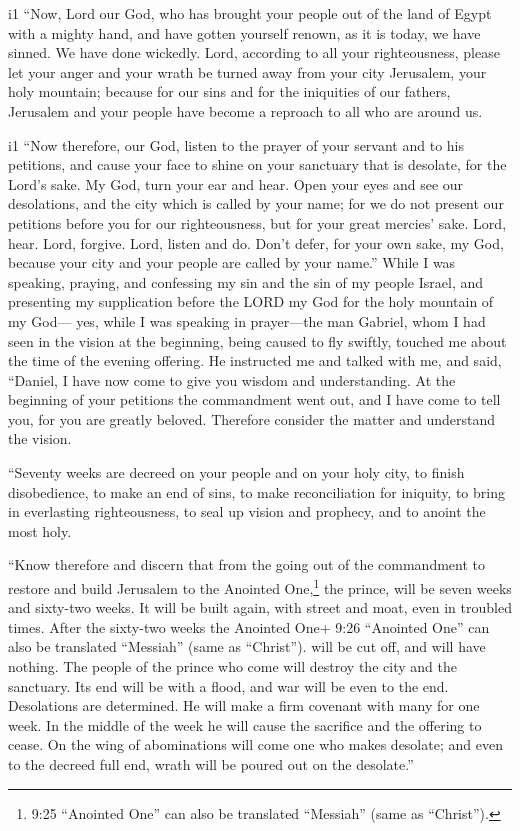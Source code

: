 i1 ``Now, Lord our God, who has brought your people out of
the land of Egypt with a mighty hand, and have gotten yourself renown,
as it is today, we have sinned. We have done wickedly. 
Lord, according to all your righteousness, please let your anger and
your wrath be turned away from your city Jerusalem, your holy mountain;
because for our sins and for the iniquities of our fathers, Jerusalem
and your people have become a reproach to all who are around us.

i1 ``Now therefore, our God, listen to the prayer of your
servant and to his petitions, and cause your face to shine on your
sanctuary that is desolate, for the Lord's sake.  My God,
turn your ear and hear. Open your eyes and see our desolations, and the
city which is called by your name; for we do not present our petitions
before you for our righteousness, but for your great mercies' sake.
 Lord, hear. Lord, forgive. Lord, listen and do. Don't
defer, for your own sake, my God, because your city and your people are
called by your name.''  While I was speaking, praying, and
confessing my sin and the sin of my people Israel, and presenting my
supplication before the LORD my God for the holy mountain of my God---
 yes, while I was speaking in prayer---the man Gabriel,
whom I had seen in the vision at the beginning, being caused to fly
swiftly, touched me about the time of the evening offering.
 He instructed me and talked with me, and said, ``Daniel, I
have now come to give you wisdom and understanding.  At the
beginning of your petitions the commandment went out, and I have come to
tell you, for you are greatly beloved. Therefore consider the matter and
understand the vision.

 ``Seventy weeks are decreed on your people and on your
holy city, to finish disobedience, to make an end of sins, to make
reconciliation for iniquity, to bring in everlasting righteousness, to
seal up vision and prophecy, and to anoint the most holy.

 ``Know therefore and discern that from the going out of
the commandment to restore and build Jerusalem to the Anointed
One,\footnote{9:25 ``Anointed One'' can also be translated ``Messiah''
  (same as ``Christ'').} the prince, will be seven weeks and sixty-two
weeks. It will be built again, with street and moat, even in troubled
times.  After the sixty-two weeks the Anointed One+ 9:26
``Anointed One'' can also be translated ``Messiah'' (same as
``Christ''). will be cut off, and will have nothing. The people of the
prince who come will destroy the city and the sanctuary. Its end will be
with a flood, and war will be even to the end. Desolations are
determined.  He will make a firm covenant with many for one
week. In the middle of the week he will cause the sacrifice and the
offering to cease. On the wing of abominations will come one who makes
desolate; and even to the decreed full end, wrath will be poured out on
the desolate.''

